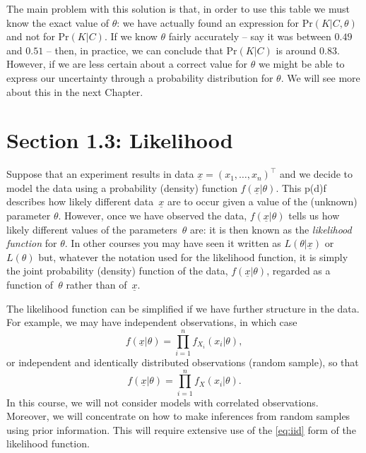 The main problem with this solution is that, in order to use this
table we must know the exact value of $\theta$: we have actually found
an expression for $\text{Pr}(K|C,\theta)$ and not for $\text{Pr}(K|C)$.  If we know
$\theta$ fairly accurately -- say it was between $0.49$ and $0.51$ --
then, in practice, we can conclude that $\text{Pr}(K|C)$ is around
0.83. However, if we are less certain about a correct value for
$\theta$ we might be able to express our uncertainty through a
probability distribution for $\theta$. We will see more about this in
the next Chapter.

\clearpage

\section{Section 1.3: Likelihood}
Suppose that an experiment results in data $\underline{x} = (x_1, \ldots, x_n)^\top$ and we decide to model the data using a probability (density) function $f(\underline{x}|\theta)$. This p(d)f describes how likely different data~$\underline{x}$ are to occur given a value of the (unknown) parameter $\theta$. However, once we have observed the data, $f(\underline{x}|\theta)$ tells us how likely different values of the parameters~$\theta$ are: it is then known as the \emph{likelihood function} for $\theta$. In other courses you may have seen it written as $L(\theta|\underline{x})$ or $L(\theta)$ but, whatever the notation used for the likelihood function, it is simply the joint probability (density) function of the data, $f(\underline{x}|\theta)$, regarded as a function of~$\theta$ rather than of~$\underline{x}$.

The likelihood function can be simplified if we have further structure in the data. For example, we may have independent observations, in which case
\begin{equation}
\label{eq:indep}
f(\underline{x}|\theta)=\prod_{i=1}^n f_{X_i}(x_i|\theta),
\end{equation}
or independent and identically distributed observations (random sample), so that
\begin{equation}
\label{eq:iid}
f(\underline{x}|\theta)=\prod_{i=1}^n f_{X}(x_i|\theta).
\end{equation}
In this course, we will not consider models with correlated observations. Moreover, we will concentrate on how to make inferences from random samples using prior information. This will require extensive use of the \eqref{eq:iid} form of the likelihood function.

